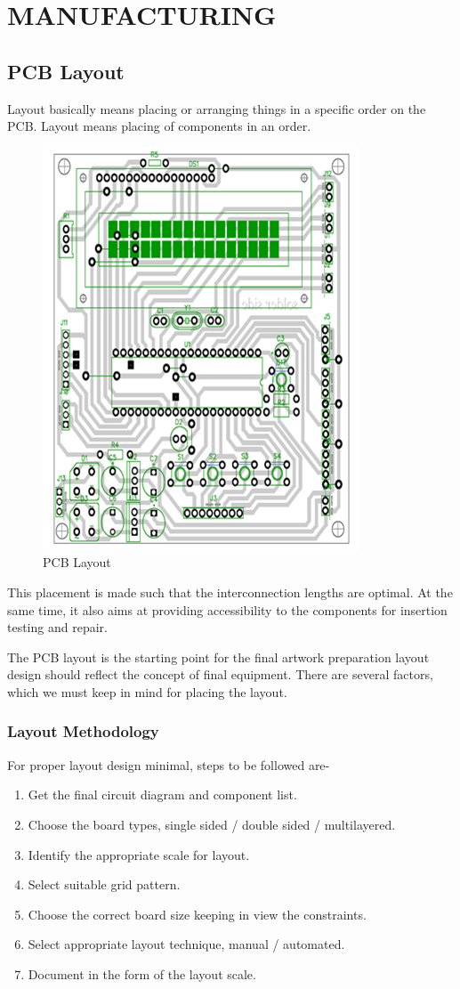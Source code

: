 \documentclass[12pt,a4paper,oneside,openright]{report}
\begin{document}
\chapter{MANUFACTURING}
\section{PCB Layout}
Layout basically means placing or arranging things in a specific order on the PCB. Layout means placing of components in an order. 
\begin{figure}[!h]
 \centering
 \includegraphics[width = .50\textwidth]{Figures/14.jpg}
 \caption{PCB Layout}
 \label{PCB Layout}
\end{figure}
This placement is made such that the interconnection lengths are optimal. At the same time, it also aims at providing accessibility to the components for insertion testing and repair.

The PCB layout is the starting point for the final artwork preparation layout design should reflect the concept of final equipment. There are several factors, which we must keep in mind for placing the layout. 

\subsection{Layout Methodology}
 For proper layout design minimal, steps to be followed are-
\begin{enumerate}
 \item Get the final circuit diagram and component list. 
\item Choose the board types, single sided / double sided / multilayered. 
\item Identify the appropriate scale for layout.
\item Select suitable grid pattern. 
\item Choose the correct board size keeping in view the constraints. 
\item Select appropriate layout technique, manual / automated. 
\item Document in the form of the layout scale.
\end{enumerate}
\end{document}
